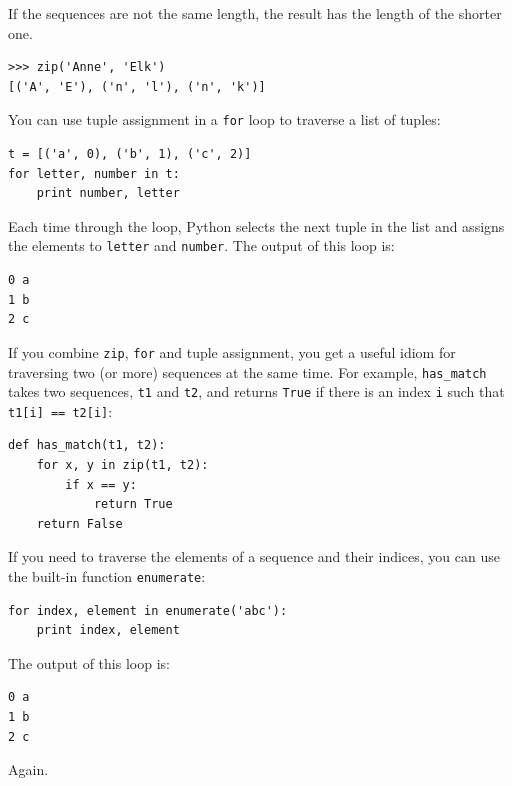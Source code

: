 \documentclass[10pt]{book}
\begin{document}

If the sequences are not the same length, the result has the
length of the shorter one.

\beforeverb
\begin{verbatim}
>>> zip('Anne', 'Elk')
[('A', 'E'), ('n', 'l'), ('n', 'k')]
\end{verbatim}
\afterverb
%
You can use tuple assignment in a {\tt for} loop to traverse a list of
tuples:


\beforeverb
\begin{verbatim}
t = [('a', 0), ('b', 1), ('c', 2)]
for letter, number in t:
    print number, letter
\end{verbatim}
\afterverb
%
Each time through the loop, Python selects the next tuple in
the list and assigns the elements to {\tt letter} and 
{\tt number}.  The output of this loop is:


\beforeverb
\begin{verbatim}
0 a
1 b
2 c
\end{verbatim}
\afterverb
%
If you combine {\tt zip}, {\tt for} and tuple assignment, you get a
useful idiom for traversing two (or more) sequences at the same
time.  For example, \verb"has_match" takes two sequences, {\tt t1} and
{\tt t2}, and returns {\tt True} if there is an index {\tt i}
such that {\tt t1[i] == t2[i]}:


\beforeverb
\begin{verbatim}
def has_match(t1, t2):
    for x, y in zip(t1, t2):
        if x == y:
            return True
    return False
\end{verbatim}
\afterverb
%
If you need to traverse the elements of a sequence and their
indices, you can use the built-in function {\tt enumerate}:


\beforeverb
\begin{verbatim}
for index, element in enumerate('abc'):
    print index, element
\end{verbatim}
\afterverb
%
The output of this loop is:

\beforeverb
\begin{verbatim}
0 a
1 b
2 c
\end{verbatim}
\afterverb
%
Again.
\end{document}
